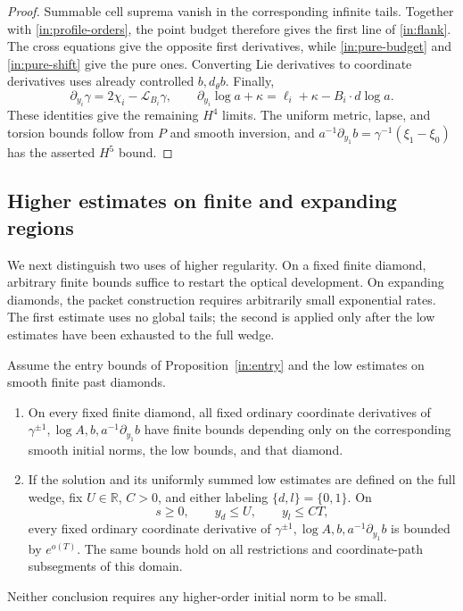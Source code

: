 \begin{proof}
Summable cell suprema vanish in the corresponding infinite tails.
Together with \eqref{in:profile-orders}, the point budget therefore
gives the first line of \eqref{in:flank}. The cross equations give
the opposite first derivatives, while \eqref{in:pure-budget} and
\eqref{in:pure-shift} give the pure ones. Converting Lie derivatives
to coordinate derivatives uses already controlled $b,d_\theta b$.
Finally,
\[
 \partial_{y_i}\gamma=2\chi_i-\mathcal L_{B_i}\gamma,
 \qquad
 \partial_{y_i}\log a+\kappa
       =\ell_i+\kappa-B_i\mathbin{\cdot}d\log a.
\]
These identities give the remaining $H^4$ limits. The uniform metric,
lapse, and torsion bounds follow from $P$ and smooth inversion, and
$a^{-1}\partial_{y_1}b=\gamma^{-1}(\xi_1-\xi_0)$ has the asserted
$H^5$ bound.
\end{proof}

\subsection{Higher estimates on finite and expanding regions}

We next distinguish two uses of higher regularity. On a fixed finite
diamond, arbitrary finite bounds suffice to restart the optical
development. On expanding diamonds, the packet construction requires
arbitrarily small exponential rates. The first estimate uses no
global tails; the second is applied only after the low estimates have
been exhausted to the full wedge.

\begin{proposition}\label{in:higher}
Assume the entry bounds of Proposition~\ref{in:entry} and the low
estimates on smooth finite past diamonds.
\begin{enumerate}
\item On every fixed finite diamond, all fixed ordinary coordinate
derivatives of $\gamma^{\pm1},\log A,b,a^{-1}\partial_{y_1}b$
have finite bounds depending only on the corresponding smooth initial
norms, the low bounds, and that diamond.
\item If the solution and its uniformly summed low estimates are
defined on the full wedge, fix $U\in\mathbb R$, $C>0$, and either
labeling $\{d,l\}=\{0,1\}$. On
\begin{equation}\label{in:high-domain}
 s\ge0,\qquad y_d\le U,\qquad y_l\le CT,
\end{equation}
every fixed ordinary coordinate derivative of
$\gamma^{\pm1},\log A,b,a^{-1}\partial_{y_1}b$ is bounded by
$e^{o(T)}$. The same bounds hold on all restrictions and coordinate-path
subsegments of this domain.
\end{enumerate}
Neither conclusion requires any higher-order initial norm to be small.
\end{proposition}

